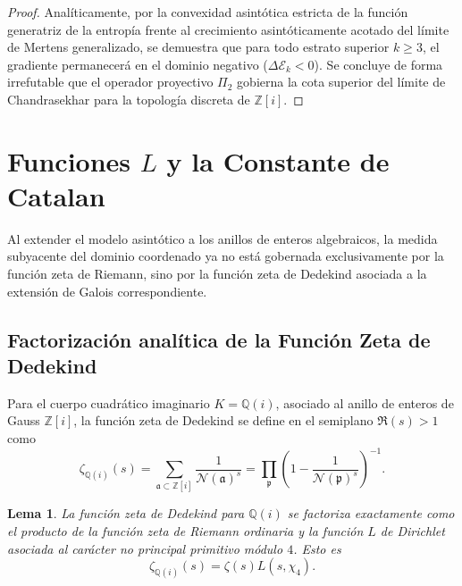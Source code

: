 \documentclass{article}
\numberwithin{equation}{section}
\theoremstyle{plain}
\newtheorem{lema}[teorema]{Lema}
\theoremstyle{definition}
\begin{document}
\begin{proof}
Analíticamente, por la convexidad asintótica estricta de la función generatriz de la entropía frente al crecimiento asintóticamente acotado del límite de Mertens generalizado, se demuestra que para todo estrato superior $k \ge 3$, el gradiente permanecerá en el dominio negativo ($\Delta \mathcal{E}_k < 0$). Se concluye de forma irrefutable que el operador proyectivo $\Pi_2$ gobierna la cota superior del límite de Chandrasekhar para la topología discreta de $\mathbb{Z}[i]$.
\end{proof}

\section{Funciones \texorpdfstring{$L$}{L} y la Constante de Catalan}
\label{sec:funciones_L}

Al extender el modelo asintótico a los anillos de enteros algebraicos, la medida subyacente del dominio coordenado ya no está gobernada exclusivamente por la función zeta de Riemann, sino por la función zeta de Dedekind asociada a la extensión de Galois correspondiente.

\subsection{Factorización analítica de la Función Zeta de Dedekind}

Para el cuerpo cuadrático imaginario $K = \mathbb{Q}(i)$, asociado al anillo de enteros de Gauss $\mathbb{Z}[i]$, la función zeta de Dedekind se define en el semiplano $\Re(s) > 1$ como
\begin{equation}
    \zeta_{\mathbb{Q}(i)}(s) = \sum_{\mathfrak{a} \subset \mathbb{Z}[i]} \frac{1}{\mathcal{N}(\mathfrak{a})^s} = \prod_{\mathfrak{p}} \left( 1 - \frac{1}{\mathcal{N}(\mathfrak{p})^s} \right)^{-1}.
\end{equation}

\begin{lema}
La función zeta de Dedekind para $\mathbb{Q}(i)$ se factoriza exactamente como el producto de la función zeta de Riemann ordinaria y la función $L$ de Dirichlet asociada al carácter no principal primitivo módulo $4$. Esto es
\begin{equation}
    \zeta_{\mathbb{Q}(i)}(s) = \zeta(s) L(s, \chi_4).
\end{equation}
\end{lema}
\end{document}

